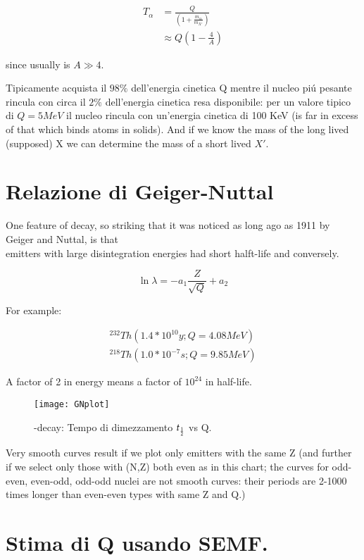 \begin{align*}
T_{\alpha}&=\frac{Q}{(1+\frac{m_{\alpha}}{m_{X'}})}\\
&\approx Q(1-\frac{4}{A})
\end{align*}

since usually is $A\gg4$.

Tipicamente \Ra acquista il $98\%$ dell'energia cinetica Q mentre il nucleo pi\'u pesante rincula con circa il $2\%$ dell'energia cinetica resa disponibile: per un valore tipico di $Q=5 MeV$ il nucleo rincula con un'energia cinetica di 100 KeV (is far in excess of that which binds atoms in solids). And if we know the mass of the long lived (supposed) X we can determine the mass of a short lived $X'$.

\section{Relazione di Geiger-Nuttal}

One  feature of \Ra decay, so striking that it was noticed as long ago as 1911 by Geiger and Nuttal, is that\\
\Ra emitters with large disintegration energies had short halft-life and conversely.

\begin{equation*}
\ln{\lambda}=-a_1\frac{Z}{\sqrt{Q}}+a_2
\end{equation*}

For example:

\begin{align*}
^{232}Th (1.4*10^{10} y; Q=4.08 MeV)\\
^{218}Th (1.0*10^{-7}s; Q=9.85 MeV)
\end{align*}

A factor of 2 in energy means a factor of $10^{24}$ in half-life.
 
 \begin{figure}[!ht]
\centering
\texttt{[image: GNplot]}
\caption{\Ra-decay: Tempo di dimezzamento $t_{\frac{1}{2}}$ vs Q.}
\label{fig:GNplot}
\end{figure}

Very smooth curves result if we plot only \Ra emitters with the same Z (and further if we select  only those with (N,Z) both even as in this chart; the curves for odd-even, even-odd, odd-odd nuclei are not smooth curves: their periods are 2-1000 times longer than even-even types with same Z and Q.)


\section{Stima di Q usando SEMF.}

